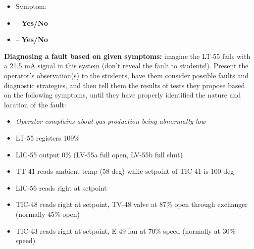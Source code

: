 \begin{itemize}
\item{} Symptom: {\it }
\item{}  -- {\bf Yes/No}
\item{}  -- {\bf Yes/No}
\end{itemize}


\vskip 10pt


\noindent
{\bf Diagnosing a fault based on given symptoms:} imagine the LT-55 fails with a 21.5 mA signal in this system (don't reveal the fault to students!).  Present the operator's observation(s) to the students, have them consider possible faults and diagnostic strategies, and then tell them the results of tests they propose based on the following symptoms, until they have properly identified the nature and location of the fault:

\begin{itemize}
\item{} {\it Operator complains about gas production being abnormally low}
\item{} LT-55 registers 109\%
\item{} LIC-55 output 0\% (LV-55a full open, LV-55b full shut)
\item{} TT-41 reads ambient temp (58 deg) while setpoint of TIC-41 is 100 deg
\item{} LIC-56 reads right at setpoint
\item{} TIC-48 reads right at setpoint, TV-48 valve at 87\% open through exchanger (normally 45\% open)
\item{} TIC-43 reads right at setpoint, E-49 fan at 70\% speed (normally at 30\% speed)
\end{itemize}








